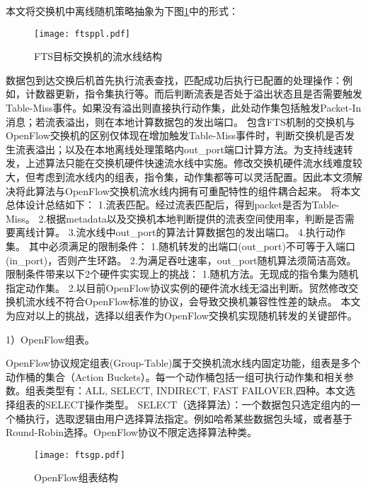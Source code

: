 本文将交换机中离线随机策略抽象为下图\ref{fig:ftsppl}中的形式：

\begin{figure}[!ht]
	\vspace{-1.5mm}
	\centering 
	\texttt{[image: ftsppl.pdf]}
	\caption{FTS目标交换机的流水线结构} \label{fig:ftsppl}
\end{figure}


数据包到达交换后机首先执行流表查找，匹配成功后执行已配置的处理操作：例如，计数器更新，指令集执行等。而后判断流表是否处于溢出状态且是否需要触发Table-Miss事件。如果没有溢出则直接执行动作集，此处动作集包括触发Packet-In消息；若流表溢出，则在本地计算数据包的发出端口。%
包含FTS机制的交换机与OpenFlow交换机的区别仅体现在增加触发Table-Miss事件时，判断交换机是否发生流表溢出；以及在本地离线处理策略内out\_port端口计算方法。为支持线速转发，上述算法只能在交换机硬件快速流水线中实施。修改交换机硬件流水线难度较大，但考虑到流水线内的组表，指令集，动作集都等可以灵活配置。因此本文须解决将此算法与OpenFlow交换机流水线内拥有可重配特性的组件耦合起来。
将本文总体设计总结如下：
1.流表匹配。经过流表匹配后，得到packet是否为Table-Miss。 
2.根据metadata以及交换机本地判断提供的流表空间使用率，判断是否需要离线计算。
3.流水线中out\_port的算法计算数据包的发出端口。
4.执行动作集。
其中必须满足的限制条件：
1.随机转发的出端口(out\_port)不可等于入端口(in\_port)，否则产生环路。
2.为满足吞吐速率，out\_port随机算法须简洁高效。
限制条件带来以下2个硬件实实现上的挑战：
1.随机方法。无现成的指令集为随机指定动作集。
2.以目前OpenFlow协议实例的硬件流水线无溢出判断。贸然修改交换机流水线不符合OpenFlow标准的协议，会导致交换机兼容性性差的缺点。
本文为应对以上的挑战，选择以组表作为OpenFlow交换机实现随机转发的关键部件。




1）OpenFlow组表。

OpenFlow协议规定组表(Group-Table)属于交换机流水线内固定功能，组表是多个动作桶的集合（Action Buckets）。每一个动作桶包括一组可执行动作集和相关参数。组表类型有：ALL, SELECT, INDIRECT, FAST FAILOVER,四种。本文选择组表的SELECT操作类型。
SELECT（选择算法）：一个数据包只选定组内的一个桶执行，选取逻辑由用户选择算法指定。例如哈希某些数据包头域，或者基于Round-Robin选择。OpenFlow协议不限定选择算法种类。

\begin{figure}[!ht]
	\centering 
	\vspace{-1.5mm} 
	\texttt{[image: ftsgp.pdf]}
	\caption{OpenFlow组表结构} \label{fig:ftsgp}
\end{figure}

